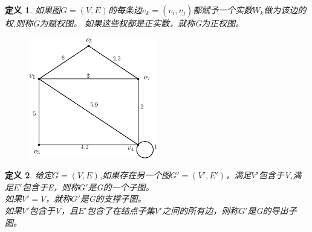 \documentclass[11pt,a4paper,openany]{book}
\newtheorem{defination}{\textbf{定义}}[section]
\begin{document}
\begin{defination}
如果图$G=(V,E)$的每条边$e_k=(v_i,v_j)$都赋予一个实数$W_k$做为该边的\textcolor[rgb]{1.00,0.00,0.00}{权},则称G为\textcolor[rgb]{1.00,0.00,0.00}{赋权图}。
如果这些权都是正实数，就称G为\textcolor[rgb]{1.00,0.00,0.00}{正权图}。
\begin{figure}[H]
  \centering
  \includegraphics[width=0.5\textwidth]{1_4.eps}\\
  \caption{}
\end{figure}

\end{defination}

\begin{defination}
给定$G=(V,E)$,如果存在另一个图$G'=(V',E')$，满足$V'$包含于V,满足$E'$包含于E，则称$G'$是G的一个\textcolor[rgb]{1.00,0.00,0.00}{子图}。\\
如果$V'=V$，就称$G'$是G的\textcolor[rgb]{1.00,0.00,0.00}{支撑子图}。\\
如果$V'$包含于V，且$E'$包含了在结点子集$V'$之间的所有边，则称$G'$是G的\textcolor[rgb]{1.00,0.00,0.00}{导出子图}。\\
\end{defination}
\end{document}
